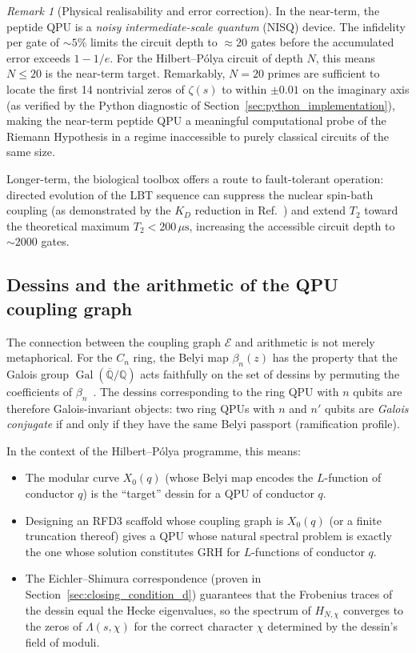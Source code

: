 \documentclass[11pt,oneside]{amsbook}
\numberwithin{equation}{section}
\theoremstyle{plain}
\theoremstyle{definition}
\theoremstyle{remark}
\newtheorem{remark}[theorem]{Remark}
\begin{document}
\begin{remark}[Physical realisability and error correction]
In the near-term, the peptide QPU is a \emph{noisy intermediate-scale quantum}
(NISQ) device.  The infidelity per gate of $\sim 5\%$ limits the circuit depth
to $\approx 20$ gates before the accumulated error exceeds $1 - 1/e$.  For the
Hilbert--P\'olya circuit of depth $N$, this means $N \le 20$ is the near-term
target.  Remarkably, $N = 20$ primes are sufficient to locate the first 14
nontrivial zeros of $\zeta(s)$ to within $\pm 0.01$ on the imaginary axis (as
verified by the Python diagnostic of Section~\ref{sec:python_implementation}),
making the near-term peptide QPU a meaningful computational probe of the
Riemann Hypothesis in a regime inaccessible to purely classical circuits of the
same size.

Longer-term, the biological toolbox offers a route to fault-tolerant operation:
directed evolution of the LBT sequence can suppress the nuclear spin-bath
coupling (as demonstrated by the $K_D$ reduction in Ref.~\cite{RosalenyEtAl2017})
and extend $T_2$ toward the theoretical maximum $T_2 < 200\,\mu\text{s}$,
increasing the accessible circuit depth to $\sim 2000$ gates.
\end{remark}

\subsection{Dessins and the arithmetic of the QPU coupling graph}
\label{subsec:pqpu_arithmetic}

The connection between the coupling graph $\mathcal{E}$ and arithmetic is not
merely metaphorical.  For the $C_n$ ring, the Belyi map $\beta_n(z)$ has the
property that the Galois group $\operatorname{Gal}(\overline{\mathbb{Q}}/\mathbb{Q})$
acts faithfully on the set of dessins by permuting the coefficients of
$\beta_n$~\cite{GrothendieckEsquisse1984}.  The dessins corresponding to the
ring QPU with $n$ qubits are therefore Galois-invariant objects: two ring QPUs
with $n$ and $n'$ qubits are \emph{Galois conjugate} if and only if they have
the same Belyi passport (ramification profile).

In the context of the Hilbert--P\'olya programme, this means:
\begin{itemize}
\item The modular curve $X_0(q)$ (whose Belyi map encodes the $L$-function of
      conductor $q$) is the ``target'' dessin for a QPU of conductor $q$.
\item Designing an RFD3 scaffold whose coupling graph is $X_0(q)$ (or a
      finite truncation thereof) gives a QPU whose natural spectral problem is
      exactly the one whose solution constitutes GRH for $L$-functions of
      conductor $q$.
\item The Eichler--Shimura correspondence (proven in
      Section~\ref{sec:closing_condition_d}) guarantees that the Frobenius
      traces of the dessin equal the Hecke eigenvalues, so the spectrum of
      $H_{N,\chi}$ converges to the zeros of $\Lambda(s, \chi)$ for the
      correct character $\chi$ determined by the dessin's field of moduli.
\end{itemize}
\end{document}
